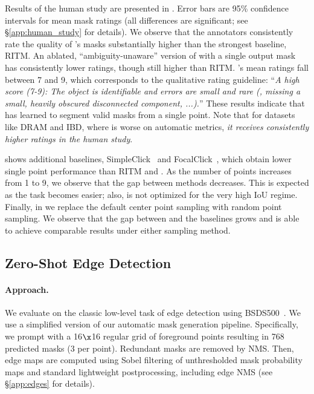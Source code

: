 Results of the human study are presented in . Error bars are 95\% confidence intervals for mean mask ratings (all differences are significant; see \S\ref{app:human_study} for details). We observe that the annotators consistently rate the quality of \sam's masks substantially higher than the strongest baseline, RITM. An ablated, ``ambiguity-unaware'' version of \sam with a single output mask has consistently lower ratings, though still higher than RITM. \sam's mean ratings fall between 7 and 9, which corresponds to the qualitative rating guideline: ``\emph{A high score (7-9): The object is identifiable and errors are small and rare (\eg, missing a small, heavily obscured disconnected component, ...).}'' These results indicate that \sam has learned to segment valid masks from a single point. Note that for datasets like DRAM and IBD, where \sam is worse on automatic metrics, \emph{it receives consistently higher ratings in the human study}.

 shows additional baselines, SimpleClick~\cite{liu2022simpleclick} and FocalClick~\cite{chen2022focalclick}, which obtain lower single point performance than RITM and \sam. As the number of points increases from 1 to 9, we observe that the gap between methods decreases. This is expected as the task becomes easier; also, \sam is not optimized for the very high IoU regime. Finally, in  we replace the default center point sampling with random point sampling. We observe that the gap between \sam and the baselines grows and \sam is able to achieve comparable results under either sampling method.

\subsection{Zero-Shot Edge Detection}\label{sec:eval:edge}

\paragraph{Approach.} We evaluate \sam on the classic low-level task of edge detection using BSDS500~\cite{martin2001database,arbelaez2010contour}. We use a simplified version of our automatic mask generation pipeline. Specifically, we prompt \sam with a 16$\x$16 regular grid of foreground points resulting in 768 predicted masks (3 per point). Redundant masks are removed by NMS. Then, edge maps are computed using Sobel filtering of unthresholded mask probability maps and standard lightweight postprocessing, including edge NMS (see \S\ref{app:edges} for details).

